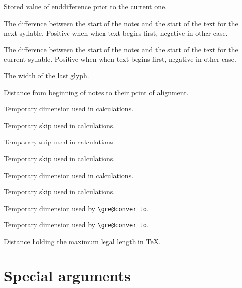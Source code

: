 Stored value of enddifference prior to the current one.

The difference between the start of the notes and the start of the text for the next syllable.  Positive when when text begins first, negative in other case.

The difference between the start of the notes and the start of the text for the current syllable.  Positive when when text begins first, negative in other case.

The width of the last glyph.

Distance from beginning of notes to their point of alignment.

Temporary dimension used in calculations.

Temporary skip used in calculations.

Temporary skip used in calculations.

Temporary skip used in calculations.

Temporary dimension used in calculations.

Temporary skip used in calculations.

Temporary dimension used by \verb=\gre@convertto=.

Temporary dimension used by \verb=\gre@convertto=.

Distance holding the maximum legal length in TeX.



\section{Special arguments}

